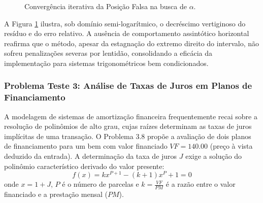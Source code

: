 \begin{figure}[H]
    \centering
    \caption{Convergência iterativa da Posição Falsa na busca de $\alpha$.}
    \label{fig:convergencia_posicao_falsa_missil}
\end{figure}

A Figura \ref{fig:convergencia_posicao_falsa_missil} ilustra, sob domínio semi-logarítmico, o decréscimo vertiginoso do resíduo e do erro relativo. A ausência de comportamento assintótico horizontal reafirma que o método, apesar da estagnação do extremo direito do intervalo, não sofreu penalizações severas por lentidão, consolidando a eficácia da implementação para sistemas trigonométricos bem condicionados.

\subsubsection{Problema Teste 3: Análise de Taxas de Juros em Planos de Financiamento}
\label{subsubsec:problema_teste_3_posicao_falsa}

A modelagem de sistemas de amortização financeira frequentemente recai sobre a resolução de polinômios de alto grau, cujas raízes determinam as taxas de juros implícitas de uma transação. O Problema 3.8 propõe a avaliação de dois planos de financiamento para um bem com valor financiado $VF = 140.00$ (preço à vista deduzido da entrada). A determinação da taxa de juros $J$ exige a solução do polinômio característico derivado do valor presente:
\begin{equation}
    f(x) = kx^{P+1} - (k+1)x^P + 1 = 0
    \label{eq:juros_polinomial_posicao_falsa}
\end{equation}
onde $x = 1+J$, $P$ é o número de parcelas e $k = \frac{VF}{PM}$ é a razão entre o valor financiado e a prestação mensal ($PM$).

